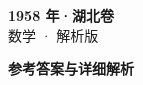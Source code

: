 \documentclass[zihao=-4, a4paper]{ctexart}
\begin{document}
\begin{center}
  {\Large\bfseries 1958 年·湖北卷}\\[4pt]
  {\large 数学 · 解析版}
\end{center}
\medskip
{}

\clearpage
{}
\begin{center}{\Large\bfseries 参考答案与详细解析}\end{center}
\medskip

\end{document}
